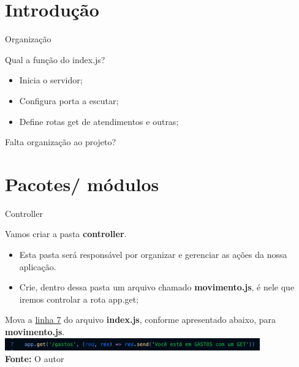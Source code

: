 \documentclass{beamer}
\begin{document}
\section{Introdução}
    \begin{frame}[label=lists]{Organização}
    \begin{exampleblock}{Qual a função do index.js?}
        	\begin{itemize}
	\item Inicia o servidor;
	\item Configura porta a escutar;
	\item Define rotas get de atendimentos e outras;
        	\end{itemize}
	\vspace{0.5cm}
	Falta organização ao projeto?
      \end{exampleblock}
    \end{frame}
\section{Pacotes/ módulos}
    \begin{frame}[label=lists]{Controller}

         Vamos criar a pasta \textbf{controller}.
         \begin{itemize}
         \item Esta pasta será responsável por organizar e gerenciar as ações da nossa aplicação. 
         \item Crie, dentro dessa pasta um arquivo chamado \textbf{movimento.js}, é nele que iremos controlar a rota app.get;
         \end{itemize}
          \vspace{0.5cm}
          Mova a \underline{linha 7} do arquivo \textbf{index.js}, conforme apresentado abaixo, para \textbf{movimento.js}.
%
	            \includegraphics[width=110mm]{resources/aula4_1.png}\\
            \tiny{\textbf{Fonte:} O autor}
    \end{frame}
\end{document}
